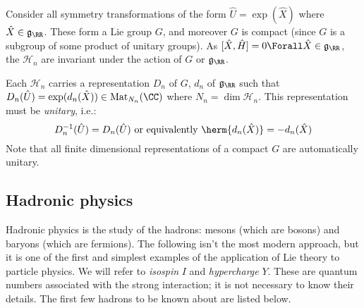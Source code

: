 \documentclass{jknotes}
\begin{document}
Consider all symmetry transformations of the form \(\hat{U} = \exp(\hat{X})\) where \(\hat{X}\in\mathfrak{g}_\RR\). These form a Lie group \(G\), and moreover \(G\) is compact (since \(G\) is a subgroup of some product of unitary groups). As \([\hat{X},\hat{H}] = 0 \Forall \hat{X}\in\mathfrak{g}_\RR\), the \(\mathcal{H}_n\) are invariant under the action of \(G\) or \(\mathfrak{g}_\RR\).

Each \(\mathcal{H}_n\) carries a representation \(D_n\) of \(G\), \(d_n\) of \(\mathfrak{g}_\RR\) such that \(D_n(\hat{U})=\exp(d_n(\hat{X})) \in \operatorname{Mat}_{N_n}(\CC)\) where \(N_n = \dim\mathcal{H}_n\). This representation must be \emph{unitary}, i.e.:
\begin{equation}
    D_n^{-1}(\hat{U}) = D_n(\hat{U}) \text{ or equivalently }  \herm{d_n(\hat{X})} = -d_n(\hat{X})
\end{equation}
Note that all finite dimensional representations of a compact \(G\) are automatically unitary.

\subsection{Hadronic physics}
Hadronic physics is the study of the hadrons: mesons (which are bosons) and baryons (which are fermions). The following isn't the most modern approach, but it is one of the first and simplest examples of the application of Lie theory to particle physics. We will refer to \emph{isospin} \(I\) and \emph{hypercharge} \(Y\). These are quantum numbers associated with the strong interaction; it is not necessary to know their details. The first few hadrons to be known about are listed below.

\begin{table}[H]
    \centering
    \caption{The first few hadrons discovered.}
\end{table}
\end{document}

